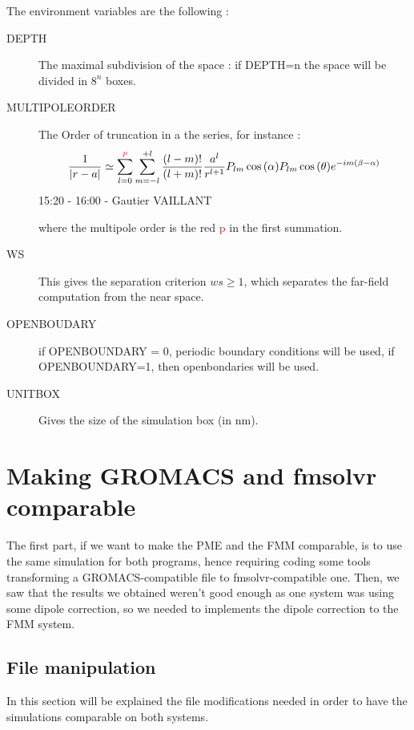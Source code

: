 \documentclass[12pt,twoside,a4paper]{report}
\begin{document}
The environment variables are the following :

\begin{description}
\item[DEPTH] The maximal subdivision of the space : if DEPTH=n the space will be divided in $8^{n}$ boxes.

\item[MULTIPOLEORDER] The Order of truncation in a the series, for instance :
\begin{equation*}
	\frac{1}{|r - a|} \simeq \sum\limits_{l=0}^{\textcolor{red}{p}} \sum\limits_{m = -l}^{+l} \frac{(l-m)!}{(l+m)!} \frac{a^l}{r^{l+1}} P_{lm}\cos{(\alpha)}P_{lm}\cos{(\theta)}e^{-im(\beta - \alpha)}
	\end{equation*}15:20 - 16:00 - Gautier VAILLANT
	
	where the multipole order is the red \textcolor{red}{p} in the first summation.
	
	
\item[WS] This gives the separation criterion $ws \geq 1$, which separates the far-field computation from the near space.

\item[OPENBOUDARY] if OPENBOUNDARY = 0, periodic boundary conditions will be used, if OPENBOUNDARY=1, then openbondaries will be used.

\item[UNITBOX] Gives the size of the simulation box (in nm).

\end{description}
 	
\section{Making GROMACS and fmsolvr comparable}	

The first part, if we want to make the PME and the FMM comparable, is to use the same simulation for both programs, hence requiring coding some tools transforming a GROMACS-compatible file to fmsolvr-compatible one. Then, we saw that the results we obtained weren't good enough as one system was using some dipole correction, so we needed to implements the dipole correction to the FMM system.

\subsection{File manipulation}

In this section will be explained the file modifications needed in order to have the simulations comparable on both systems.
\end{document}
